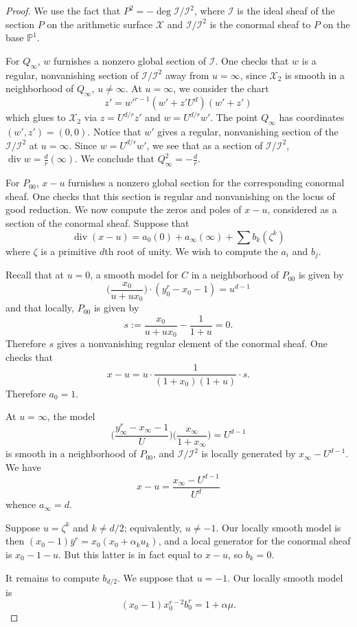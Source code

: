 \documentclass[reqno]{amsart}
\theoremstyle{definition}
\theoremstyle{remark}
\DeclareMathOperator{\dvsr}{div}
\def \PP {{\mathbb P}^1}
\def\II{\mathcal{I}}
\def\XX{\mathcal{X}}
\begin{document}
\begin{proof}
  We use the fact that $P^2 = - \deg \II/\II^2$, where $\II$ is the ideal sheaf of the section $P$ on the arithmetic surface $\XX$ and $\II/\II^2$ is the conormal sheaf to $P$ on the base $\PP$. 

For $Q_\infty$, $w$ furnishes a nonzero global section of $\II$. One checks that $w$ is a regular, nonvanishing section of $\II/\II^2$ away from $u = \infty$, since $\XX_2$ is smooth in a neighborhood of $Q_\infty$, $u \neq \infty$. At $u = \infty$, we consider the chart
  \[
  z' = w'^{r-1}(w'+z'U^d)(w'+z')
  \]
  which glues to $\XX_2$ via $z = U^{d/r} z'$ and $w = U^{d/r} w'$. The point $Q_\infty$ has coordinates $(w', z') = (0,0)$. Notice that $w'$ gives a regular, nonvanishing section of the $\II/\II^2$ at $u = \infty$. Since $w = U^{d/r} w'$, we see that as a section of $\II/\II^2$, $\dvsr w = \frac{d}{r}(\infty)$. We conclude that $Q_\infty^2 = -\frac{d}{r}$.

For $P_{00}$, $x-u$ furnishes a nonzero global section for the corresponding conormal sheaf. One checks that this section is regular and nonvanishing on the locus of good reduction. We now compute the zeros and poles of $x-u$, considered as a section of the conormal sheaf. Suppose that
\[
\dvsr (x-u) = a_0 (0) + a_\infty (\infty) + \sum b_k (\zeta^k)
\]
where $\zeta$ is a primitive $d$th root of unity. We wish to compute the $a_i$ and $b_j$.

Recall that at $u=0$, a smooth model for $C$ in a neighborhood of $P_{00}$ is given by
\[
\bigg(\frac{x_0}{u + ux_0}\bigg) \cdot (y_0^r - x_0 - 1) = u^{d-1}
\]
and that locally, $P_{00}$ is given by
\[
s := \frac{x_0}{u+ux_0} - \frac{1}{1+u} = 0.
\]
Therefore $s$ gives a nonvanishing regular element of the conormal sheaf. One checks that
\[
x - u = u \cdot \frac{1}{(1+x_0)(1+u)} \cdot s.
\]
Therefore $a_0 = 1$.

At $u = \infty$, the model
\[
\bigg(\frac{y_\infty^r - x_\infty - 1}{U}\bigg)\bigg(\frac{x_\infty}{1 + x_\infty}\bigg) = U^{d-1}
\]
is smooth in a neighborhood of $P_{00}$, and $\II/\II^2$ is locally generated by $x_\infty - U^{d-1}$. We have
\[
x - u = \frac{x_\infty - U^{d-1}}{U^d}
\]
whence $a_\infty = d$.

Suppose $u = \zeta^k$ and $k \neq d/2$; equivalently, $u \neq -1$. Our locally smooth model is then $(x_0 - 1)\bar{y}^r = x_0(x_0 + \alpha_k u_k)$, and a local generator for the conormal sheaf is $x_0 - 1 - u$. But this latter is in fact equal to $x - u$, so $b_k = 0$.

It remains to compute $b_{d/2}$. We suppose that $u = -1$. Our locally smooth model is
\[
(x_0 - 1)x_0^{r-2}b_0^r = 1 + \alpha \mu.
\]

\end{proof}
\end{document}
